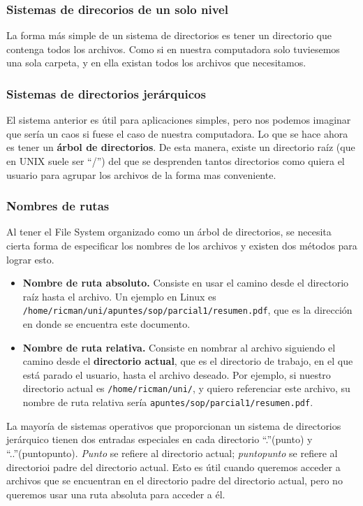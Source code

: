\documentclass[12pt]{article}
\begin{document}
  \subsubsection{Sistemas de direcorios de un solo nivel}
  La forma más simple de un sistema de directorios es tener un directorio que contenga todos los archivos. Como si en nuestra computadora solo tuviesemos una sola carpeta, y en ella existan todos los archivos que necesitamos.

  \subsubsection{Sistemas de directorios jerárquicos}
  El sistema anterior es útil para aplicaciones simples, pero nos podemos imaginar que sería un caos si fuese el caso de nuestra computadora. Lo que se hace ahora es tener un \textbf{árbol de directorios}. De esta manera, existe un directorio raíz (que en UNIX suele ser ``/'') del que se desprenden tantos directorios como quiera el usuario para agrupar los archivos de la forma mas conveniente.

  \subsubsection{Nombres de rutas}
  Al tener el File System organizado como un árbol de directorios, se necesita cierta forma de especificar los nombres de los archivos y existen dos métodos para lograr esto.
  \begin{itemize}
    \item \textbf{Nombre de ruta absoluto.} Consiste en usar el camino desde el directorio raíz hasta el archivo. Un ejemplo en Linux es \verb|/home/ricman/uni/apuntes/sop/parcial1/resumen.pdf|, que es la dirección en donde se encuentra este documento.

    \item \textbf{Nombre de ruta relativa.} Consiste en nombrar al archivo siguiendo el camino desde el \textbf{directorio actual}, que es el directorio de trabajo, en el que está parado el usuario, hasta el archivo deseado. Por ejemplo, si nuestro directorio actual es \verb|/home/ricman/uni/|, y quiero referenciar este archivo, su nombre de ruta relativa sería \verb|apuntes/sop/parcial1/resumen.pdf|.
  \end{itemize}

  La mayoría de sistemas operativos que proporcionan un sistema de directorios jerárquico tienen dos entradas especiales en cada directorio ``.''(punto) y ``..''(puntopunto). \textit{Punto} se refiere al directorio actual; \textit{puntopunto} se refiere al directorioi padre del directorio actual. Esto es útil cuando queremos acceder a archivos que se encuentran en el directorio padre del directorio actual, pero no queremos usar una ruta absoluta para acceder a él.
\end{document}
